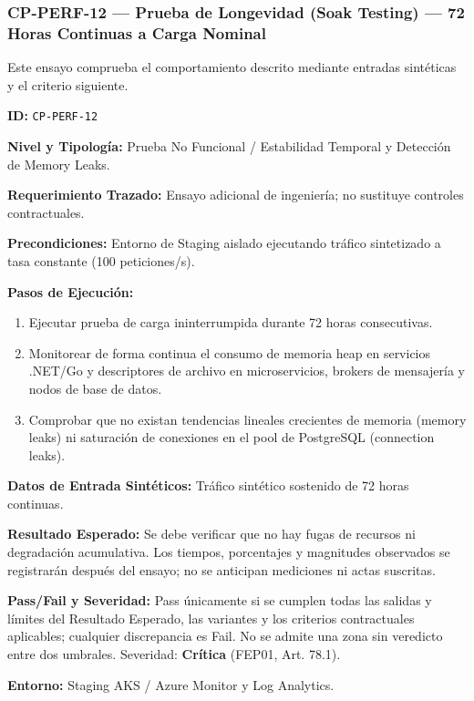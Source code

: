 \subsubsection*{CP-PERF-12 — Prueba de Longevidad (Soak Testing) — 72 Horas Continuas a Carga Nominal}\label{sec:9-cp-perf-12}
Este ensayo comprueba el comportamiento descrito mediante entradas sintéticas y el criterio siguiente.

\par\noindent\textbf{ID:} \texttt{C\allowbreak{}P\allowbreak{}-\allowbreak{}P\allowbreak{}E\allowbreak{}R\allowbreak{}F\allowbreak{}-\allowbreak{}1\allowbreak{}2\allowbreak{}}\par
\par\noindent\textbf{Nivel y Tipología:} Prueba No Funcional / Estabilidad Temporal y Detección de Memory Leaks.\par
\par\noindent\textbf{Requerimiento Trazado:} Ensayo adicional de ingeniería; no sustituye controles contractuales.\par
\par\noindent\textbf{Precondiciones:} Entorno de Staging aislado ejecutando tráfico sintetizado a tasa constante (100 peticiones/s).\par
\par\noindent\textbf{Pasos de Ejecución:} \par
\begin{enumerate}
\item Ejecutar prueba de carga ininterrumpida durante 72 horas consecutivas.
\item Monitorear de forma continua el consumo de memoria heap en servicios .NET/Go y descriptores de archivo en microservicios, brokers de mensajería y nodos de base de datos.
\item Comprobar que no existan tendencias lineales crecientes de memoria (memory leaks) ni saturación de conexiones en el pool de PostgreSQL (connection leaks).
\end{enumerate}
\par\noindent\textbf{Datos de Entrada Sintéticos:} Tráfico sintético sostenido de 72 horas continuas.\par
\par\noindent\textbf{Resultado Esperado:} Se debe verificar que no hay fugas de recursos ni degradación acumulativa. Los tiempos, porcentajes y magnitudes observados se registrarán después del ensayo; no se anticipan mediciones ni actas suscritas.\par
\par\noindent\textbf{Pass/Fail y Severidad:} Pass únicamente si se cumplen todas las salidas y límites del Resultado Esperado, las variantes y los criterios contractuales aplicables; cualquier discrepancia es Fail. No se admite una zona sin veredicto entre dos umbrales. Severidad: \textbf{Crítica} (FEP01, Art. 78.1).\par
\par\noindent\textbf{Entorno:} Staging AKS / Azure Monitor y Log Analytics.\par


